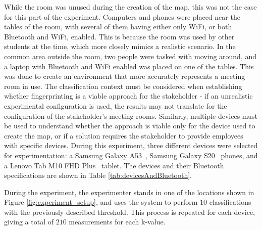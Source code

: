 While the room was unused during the creation of the map, this was not the case for this part of the experiment.
Computers and phones were placed near the tables of the room, with several of them having either only WiFi, or both Bluetooth and WiFi, enabled. 
This is because the room was used by other students at the time, which more closely mimics a realistic scenario.
In the common area outside the room, two people were tasked with moving around, and a laptop with Bluetooth and WiFi enabled was placed on one of the tables.
This was done to create an environment that more accurately represents a meeting room in use.
The classification context must be considered when establishing whether fingerprinting is a viable approach for the stakeholder - if an unrealistic experimental configuration is used, the results may not translate for the configuration of the stakeholder's meeting rooms. 
Similarly, multiple devices must be used to understand whether the approach is viable only for the device used to create the map, or if a solution requires the stakeholder to provide employees with specific devices. 
During this experiment, three different devices were selected for experimentation: a Samsung Galaxy A53~\cite{a53phone}, Samsung Galaxy S20~\cite{galaxy20phone} phones, and a Lenovo Tab M10 FHD Plus~\cite{tablet} tablet. 
The devices and their Bluetooth specifications are shown in Table \ref{tab:devicesAndBluetooth}.

\begin{table}[h!]
    \caption{The devices used in during classification and their supported Bluetooth version.}
    \label{tab:devicesAndBluetooth}
\end{table}

During the experiment, the experimenter stands in one of the locations shown in Figure \ref{fig:experiment_setup}, and uses the system to perform $10$ classifications with the previously described threshold.
This process is repeated for each device, giving a total of $210$ measurements for each k-value.